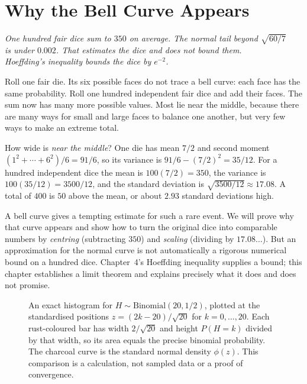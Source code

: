 \chapter{Why the Bell Curve Appears}

\begin{center}\itshape
One hundred fair dice sum to $350$ on average. The normal tail beyond $\sqrt{60/7}$\\
is under $0.002$. That estimates the dice and does not bound them.\\
Hoeffding's inequality bounds the dice by $e^{-2}$.
\end{center}

Roll one fair die. Its six possible faces do not trace a bell curve: each face has the same probability. Roll one hundred independent fair dice and add their faces. The sum now has many more possible values. Most lie near the middle, because there are many ways for small and large faces to balance one another, but very few ways to make an extreme total.

How wide is \emph{near the middle}? One die has mean $7/2$ and second moment $(1^2+\cdots+6^2)/6=91/6$, so its variance is $91/6-(7/2)^2=35/12$. For a hundred independent dice the mean is $100(7/2)=350$, the variance is $100(35/12)=3500/12$, and the standard deviation is $\sqrt{3500/12}\approx17.08$. A total of $400$ is $50$ above the mean, or about $2.93$ standard deviations high.

A bell curve gives a tempting estimate for such a rare event. We will prove why that curve appears and show how to turn the original dice into comparable numbers by \emph{centring} (subtracting $350$) and \emph{scaling} (dividing by $17.08\ldots$). But an approximation for the normal curve is not automatically a rigorous numerical bound on a hundred dice. Chapter~4's Hoeffding inequality supplies a bound; this chapter establishes a limit theorem and explains precisely what it does and does not promise.

\begin{figure}[ht]
\centering
{}
\caption{An exact histogram for $H\sim\mathrm{Binomial}(20,1/2)$, plotted at the standardised positions $z=(2k-20)/\sqrt{20}$ for $k=0,\ldots,20$. Each rust-coloured bar has width $2/\sqrt{20}$ and height $P(H=k)$ divided by that width, so its area equals the precise binomial probability. The charcoal curve is the standard normal density $\phi(z)$. This comparison is a calculation, not sampled data or a proof of convergence.}
\label{fig:sums}
\end{figure}

